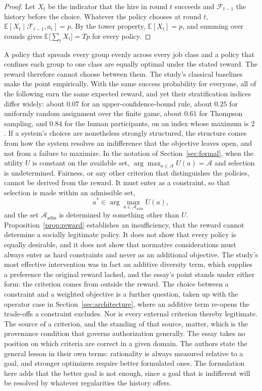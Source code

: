 \documentclass[11pt]{article}
\theoremstyle{definition}
\theoremstyle{remark}
\begin{document}
\begin{proof}
Let $X_t$ be the indicator that the hire in round $t$ succeeds and $\mathcal{F}_{t-1}$ the history before the choice. Whatever the policy chooses at round $t$, $\mathbb{E}[X_t\mid\mathcal{F}_{t-1},a_t]=p$. By the tower property, $\mathbb{E}[X_t]=p$, and summing over rounds gives $\mathbb{E}\big[\sum_t X_t\big]=Tp$ for every policy.
\end{proof}

A policy that spreads every group evenly across every job class and a policy that confines each group to one class are equally optimal under the stated reward. The reward therefore cannot choose between them. The study's classical baselines make the point empirically. With the same success probability for everyone, all of the following earn the same expected reward, and yet their stratification indices differ widely: about $0.07$ for an upper-confidence-bound rule, about $0.25$ for uniformly random assignment over the finite game, about $0.61$ for Thompson sampling, and $0.84$ for the human participants, on an index whose maximum is $2$ \cite{wu2026bias}. If a system's choices are nonetheless strongly structured, the structure comes from how the system resolves an indifference that the objective leaves open, and not from a failure to maximize. In the notation of Section~\ref{sec:formal}, when the utility $U$ is constant on the available set, $\arg\max_{a\in\mathcal{A}}U(a)=\mathcal{A}$ and selection is undetermined. Fairness, or any other criterion that distinguishes the policies, cannot be derived from the reward. It must enter as a constraint, so that selection is made within an admissible set,
\[
a^{\ast}\in\arg\max_{a\in\mathcal{A}_{\mathrm{adm}}}U(a),
\]
and the set $\mathcal{A}_{\mathrm{adm}}$ is determined by something other than $U$. Proposition~\ref{prop:reward} establishes an insufficiency, that the reward cannot determine a socially legitimate policy. It does not show that every policy is equally desirable, and it does not show that normative considerations must always enter as hard constraints and never as an additional objective. The study's most effective intervention was in fact an additive diversity term, which supplies a preference the original reward lacked, and the essay's point stands under either form: the criterion comes from outside the reward. The choice between a constraint and a weighted objective is a further question, taken up with the operator case in Section~\ref{sec:architecture}, where an additive term re-opens the trade-offs a constraint excludes. Nor is every external criterion thereby legitimate. The source of a criterion, and the standing of that source, matter, which is the provenance condition that governs authorization generally. The essay takes no position on which criteria are correct in a given domain. The authors state the general lesson in their own terms: rationality is always measured relative to a goal, and stronger optimizers require better formulated ones. The formulation here adds that the better goal is not enough, since a goal that is indifferent will be resolved by whatever regularities the history offers.
\end{document}
